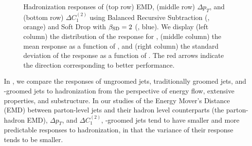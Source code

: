 \begin{figure}[p]
\centering
{}
\\
\\
\caption{
    Hadronization responses of (top row) EMD, (middle row) \(\Delta p_T\), and (bottom row) \(\Delta C_1^{(2)}\) using Balanced Recursive Subtraction (, orange) and Soft Drop with \(\beta_{\rm SD} = 2\) (, blue).
    We display (left column) the distribution of the response for , (middle column) the mean response as a function of \zcut, and (right column) the standard deviation of the response as a function of \zcut.
%
The red arrows indicate the direction corresponding to better performance.
}
\label{fig:parton_hadron_response}
\end{figure}

In , we compare the responses of ungroomed jets, traditionally groomed jets, and \PIRANHA{}-groomed jets to hadronization from the perspective of energy flow, extensive properties, and substructure.
%
In our studies of the Energy Mover's Distance (EMD) between parton-level jets and their hadron level counterparts (the parton-hadron EMD), \(\Delta p_T\), and \(\Delta C_1^{(2)}\), \PIRANHA{}-groomed jets tend to have smaller and more predictable responses to hadronization, in that the variance of their response tends to be smaller.

